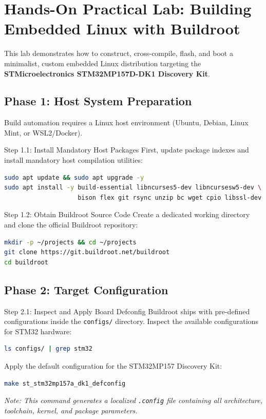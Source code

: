 \section{Hands-On Practical Lab: Building Embedded Linux with Buildroot}

This lab demonstrates how to construct, cross-compile, flash, and boot a minimalist, custom embedded Linux distribution targeting the \textbf{STMicroelectronics STM32MP157D-DK1 Discovery Kit}.

\subsection{Phase 1: Host System Preparation}
Build automation requires a Linux host environment (Ubuntu, Debian, Linux Mint, or WSL2/Docker).

\begin{cmdbox}{Step 1.1: Install Mandatory Host Packages}
First, update package indexes and install mandatory host compilation utilities:
\begin{lstlisting}[language=bash]
sudo apt update && sudo apt upgrade -y
sudo apt install -y build-essential libncurses5-dev libncursesw5-dev \
                    bison flex git rsync unzip bc wget cpio libssl-dev
\end{lstlisting}
\end{cmdbox}

\begin{cmdbox}{Step 1.2: Obtain Buildroot Source Code}
Create a dedicated working directory and clone the official Buildroot repository:
\begin{lstlisting}[language=bash]
mkdir -p ~/projects && cd ~/projects
git clone https://git.buildroot.net/buildroot
cd buildroot
\end{lstlisting}
\end{cmdbox}

\subsection{Phase 2: Target Configuration}

\begin{cmdbox}{Step 2.1: Inspect and Apply Board Defconfig}
Buildroot ships with pre-defined configurations inside the \texttt{configs/} directory. Inspect the available configurations for STM32 hardware:
\begin{lstlisting}[language=bash]
ls configs/ | grep stm32
\end{lstlisting}
Apply the default configuration for the STM32MP157 Discovery Kit:
\begin{lstlisting}[language=bash]
make st_stm32mp157a_dk1_defconfig
\end{lstlisting}
\textit{Note: This command generates a localized \texttt{.config} file containing all architecture, toolchain, kernel, and package parameters.}
\end{cmdbox}

